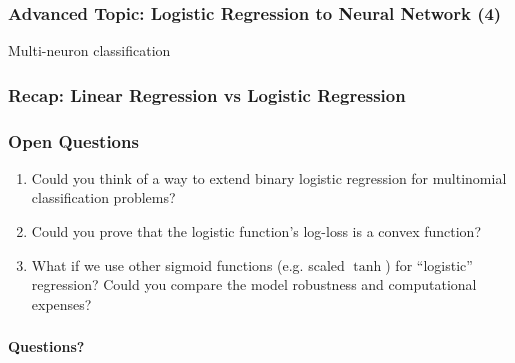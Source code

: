 \documentclass[10pt,aspectratio=169]{beamer}
\begin{document}
      \begin{frame}
        \frametitle{Advanced Topic: Logistic Regression to Neural Network (4)}
        Multi-neuron classification
        
      \end{frame}

      \begin{frame}
        \frametitle{Recap: Linear Regression vs Logistic Regression}
        
      \end{frame}

      \begin{frame}
        \frametitle{Open Questions}

        \begin{enumerate}
        \item Could you think of a way to extend binary logistic regression for multinomial classification problems?

          
        \item Could you prove that the logistic function's log-loss is a convex function?

          
        \item What if we use other sigmoid functions (e.g. scaled $\tanh$) for ``logistic'' regression? Could you compare the model robustness and computational expenses?
        
        \end{enumerate}
        
      \end{frame}

      \begin{frame}[c]
        \frametitle{}
        \centering
        \vspace{3em}
        {\Huge \bfseries Questions?}
      \end{frame}
      
    
    
\end{document}
